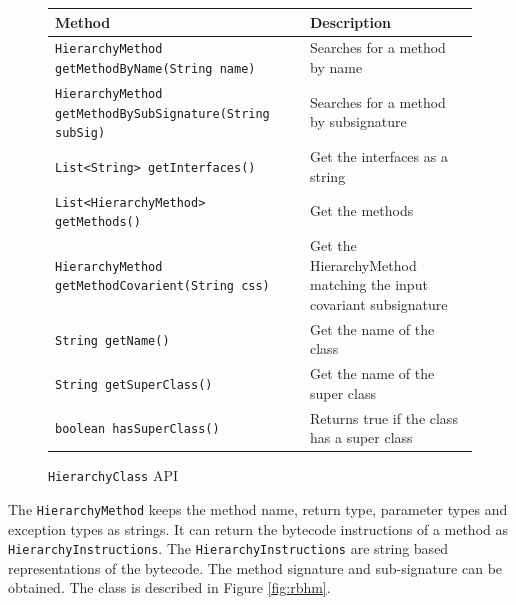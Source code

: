 \documentclass[preprint]{sigplanconf}
\begin{document}
\begin{figure}[htbf]
\begin{tabularx}{\textwidth}{|XX|}
\hline
{\bf Method} & {\bf Description }\\\hline
{\tt HierarchyMethod getMethodByName(String name)} &  Searches for a 
    method by name\\\hline
{\tt HierarchyMethod getMethodBySubSignature(String subSig)} & 
    Searches for a method by subsignature\\\hline
{\tt List<String> getInterfaces()} & Get the interfaces as a string \\\hline
{\tt List<HierarchyMethod> getMethods()} & Get the methods\\\hline
{\tt HierarchyMethod getMethodCovarient(String css)} & Get the
    HierarchyMethod matching the input covariant subsignature\\\hline
{\tt String getName()} & Get the name of the class\\\hline
{\tt String getSuperClass()} & Get the name of the super class\\\hline 
{\tt boolean hasSuperClass()} & Returns true if the class has a 
    super class\\\hline
\end{tabularx}
\caption{{\tt HierarchyClass} API}
\label{fig:rbhc}
\end{figure}

The {\tt HierarchyMethod} keeps the method name, return type, parameter types and exception types as strings. It can return the bytecode instructions of a method as {\tt HierarchyInstructions}. The {\tt HierarchyInstructions} are string based representations of the bytecode. The method signature and sub-signature can be obtained. The class is described in Figure \ref{fig:rbhm}.
\end{document}
